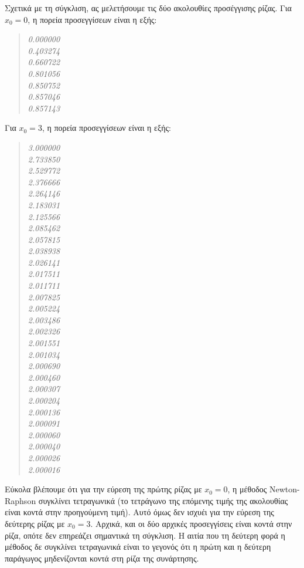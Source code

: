 \documentclass[a4paper, 14pt]{article}   %
\begin{document}
Σχετικά με τη σύγκλιση, ας μελετήσουμε τις δύο ακολουθίες προσέγγισης ρίζας.
Για \(x_0=0\), η πορεία προσεγγίσεων είναι η εξής:
\begin{quote}
	{\small \emph{0.000000\\0.403274\\0.660722\\0.801056\\0.850752\\0.857046\\0.857143}}
\end{quote}
Για \(x_0=3\), η πορεία προσεγγίσεων είναι η εξής:
\begin{quote}
	{\small \emph{3.000000\\2.733850\\2.529772\\2.376666\\2.264146\\2.183031\\2.125566\\2.085462\\2.057815\\2.038938\\2.026141\\2.017511\\2.011711\\2.007825\\2.005224\\2.003486\\2.002326
	\\2.001551\\2.001034\\2.000690\\2.000460\\2.000307\\2.000204\\2.000136\\2.000091\\2.000060\\2.000040\\2.000026\\2.000016}}
\end{quote}
Εύκολα βλέπουμε ότι για την εύρεση της πρώτης ρίζας με \(x_0=0\), η μέθοδος Newton-Raphson συγκλίνει τετραγωνικά (το τετράγωνο της επόμενης τιμής της ακολουθίας είναι κοντά στην προηγούμενη τιμή).
Αυτό όμως δεν ισχυέι για την εύρεση της δεύτερης ρίζας με \(x_0=3\). Αρχικά, και οι δύο αρχικές προσεγγίσεις είναι κοντά στην ρίζα, οπότε δεν επηρεάζει σημαντικά τη σύγκλιση. Η αιτία που τη δεύτερη φορά η μέθοδος δε συγκλίνει τετραγωνικά είναι το γεγονός ότι η πρώτη και η δεύτερη παράγωγος μηδενίζονται κοντά στη ρίζα της συνάρτησης.
\end{document}
